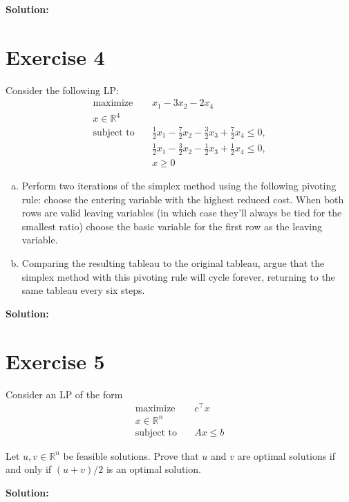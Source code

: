 \documentclass{article}
\begin{document}
\textbf{Solution: }
\newpage

\section*{Exercise 4}
Consider the following LP:
\begin{align*}
\text{maximize} \quad & x_1 - 3x_2 - 2x_4 \\
x \in \mathbb{R}^4 \\
\text{subject to} \quad & \frac{1}{2}x_1 - \frac{7}{2}x_2 - \frac{3}{2}x_3 + \frac{7}{2}x_4 \leq 0, \\
& \frac{1}{2}x_1 - \frac{3}{2}x_2 - \frac{1}{2}x_3 + \frac{1}{2}x_4 \leq 0, \\
& x \geq 0
\end{align*}

\begin{enumerate}[(a)]
\item Perform two iterations of the simplex method using the following pivoting rule: choose the entering variable with the highest reduced cost. When both rows are valid leaving variables (in which case they'll always be tied for the smallest ratio) choose the basic variable for the first row as the leaving variable.
\item Comparing the resulting tableau to the original tableau, argue that the simplex method with this pivoting rule will cycle forever, returning to the same tableau every six steps.
\end{enumerate}

\textbf{Solution: }
\newpage

\section*{Exercise 5}
Consider an LP of the form
\begin{align*}
\text{maximize} \quad & c^\top x \\
x \in \mathbb{R}^n \\
\text{subject to} \quad & Ax \leq b
\end{align*}

Let $u, v \in \mathbb{R}^n$ be feasible solutions. Prove that $u$ and $v$ are optimal solutions if and only if $(u + v)/2$ is an optimal solution.

\textbf{Solution: }
\end{document}
